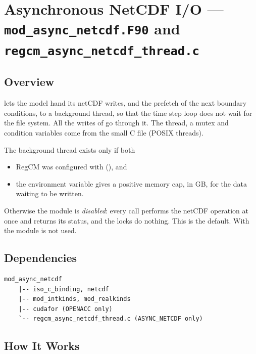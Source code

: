 \section{Asynchronous NetCDF I/O --- \texttt{mod\_async\_netcdf.F90} and
         \texttt{regcm\_async\_netcdf\_thread.c}}
\label{sec:async_netcdf}

\subsection{Overview}

 lets the model hand its netCDF writes, and the
prefetch of the next boundary conditions, to a background thread, so that
the time step loop does not wait for the file system. All the writes of
 go through it. The thread, a mutex and condition
variables come from the small C file 
(POSIX threads).

The background thread exists only if both
\begin{itemize}
  \item RegCM was configured with 
        (), and
  \item the environment variable  gives a
        positive memory cap, in GB, for the data waiting to be written.
\end{itemize}
Otherwise the module is \emph{disabled}: every call performs the netCDF
operation at once and returns its status, and the locks do nothing. This is
the default. With  the module is not used.

\subsection{Dependencies}

\begin{lstlisting}
mod_async_netcdf
    |-- iso_c_binding, netcdf
    |-- mod_intkinds, mod_realkinds
    |-- cudafor (OPENACC only)
    `-- regcm_async_netcdf_thread.c (ASYNC_NETCDF only)
\end{lstlisting}

\subsection{How It Works}

